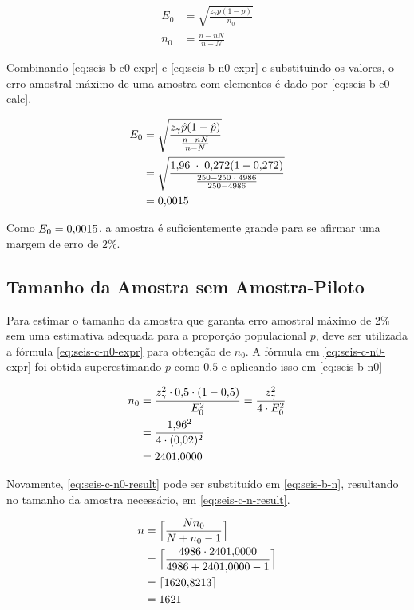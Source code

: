	\begin{align}
		E_0 &= \label{eq:seis-b-e0-expr}
			   \sqrt{\frac{z_\gamma p(1 - p) }{n_0}} \\
		n_0 &= \label{eq:seis-b-n0-expr}
			   \frac{n-n N}{n-N}
	\end{align}

	Combinando \eqref{eq:seis-b-e0-expr} e \eqref{eq:seis-b-n0-expr} e
	substituindo os valores, o erro amostral máximo de uma amostra com
	\SEISn elementos é dado por \eqref{eq:seis-b-e0-calc}.

	\begin{align}
		\label{eq:seis-b-e0-calc}
		E_0 &= \sqrt{\frac{z_\gamma \hat{p}(1 - \hat{p}) }{\frac{n-n N}{n - N}}} \\
			&= \sqrt{\frac{\num{1.96} \;\cdot\; \num{0.272} (1 - \num{0.272}) }{\frac{250 - 250 \;\cdot\; 4986}{250 - 4986}}} \nonumber \\
			&= \num{0.0015} \nonumber
	\end{align}

	Como $E_0 = \num{0.0015}$, a amostra é suficientemente grande para se afirmar
	uma margem de erro de $2\%$.

\subsection{Tamanho da Amostra sem Amostra-Piloto}

	Para estimar o tamanho da amostra que garanta erro amostral máximo de 2\%
	sem uma estimativa adequada para a proporção populacional $p$, deve ser
	utilizada a fórmula \eqref{eq:seis-c-n0-expr} para obtenção de $n_0$. A
	fórmula em \eqref{eq:seis-c-n0-expr} foi obtida superestimando $p$ como
	$\num{0.5}$ e aplicando isso em \eqref{eq:seis-b-n0}

	\begin{align}
		n_0 &= \label{eq:seis-c-n0-expr}
			   \frac{z_\gamma^2 \cdot \num{0.5} \cdot (1 - \num{0.5})}{E_0^2} = \frac{z_\gamma^2}{4 \cdot E_0^2} \\
			&= \frac{\num{1.96}^2}{4 \cdot (\num{0.02})^2} \nonumber \\
			&= \label{eq:seis-c-n0-result}
			   \num{2401.0000}
	\end{align}

	Novamente, \eqref{eq:seis-c-n0-result} pode ser substituído em
	\eqref{eq:seis-b-n}, resultando no tamanho da amostra necessário, em
	\eqref{eq:seis-c-n-result}.

	\begin{align}
		n &= \Big\lceil \frac{N n_0}{N + n_0 - 1} \nonumber \Big\rceil \\
		  &= \Big\lceil \frac{4986 \cdot \num{2401.0000}}{4986 + \num{2401.0000} - 1} \Big\rceil \nonumber \\
		  &= \lceil \num{1620.8213} \rceil \nonumber \\
		  &= \label{eq:seis-c-n-result} 
			 1621
	\end{align}

